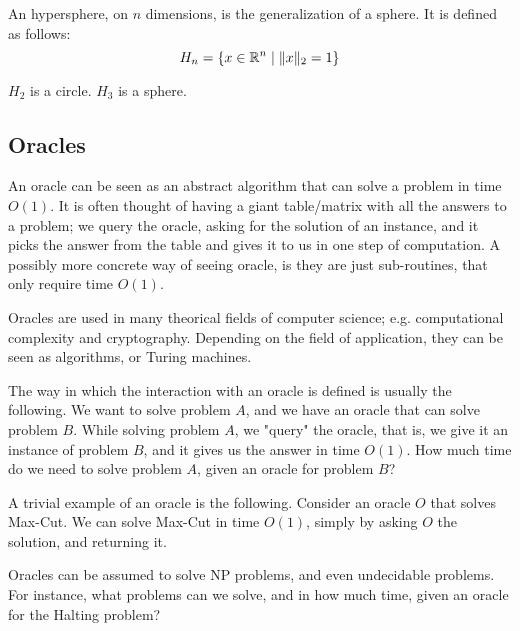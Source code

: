     An hypersphere, on $n$ dimensions, is the generalization of a sphere.
    It is defined as follows:
    \[ H_n = \{ x \in \mathbb{R}^n \; \vert \; \lVert x \rVert_2 = 1 \} \]

    $H_2$ is a circle. $H_3$ is a sphere.


\subsection{Oracles}\label{subsec:oracles_cc}
    An oracle can be seen as an abstract algorithm that can solve a problem in time $O(1)$.
    It is often thought of having a giant table/matrix with all the answers to a problem; we query the oracle, asking for the solution of an instance, and it picks the answer from the table and gives it to us in one step of computation. A possibly more concrete way of seeing oracle, is they are just sub-routines, that only require time $O(1)$.

    Oracles are used in many theorical fields of computer science; e.g. computational complexity and cryptography.
    Depending on the field of application, they can be seen as algorithms, or Turing machines.

    The way in which the interaction with an oracle is defined is usually the following.
    We want to solve problem $A$, and we have an oracle that can solve problem $B$. While solving problem $A$, we "query" the oracle, that is, we give it an instance of problem $B$, and it gives us the answer in time $O(1)$. How much time do we need to solve problem $A$, given an oracle for problem $B$?

    A trivial example of an oracle is the following.
    Consider an oracle $O$ that solves Max-Cut. We can solve Max-Cut in time $O(1)$, simply by asking $O$ the solution, and returning it.

    Oracles can be assumed to solve NP problems, and even undecidable problems. For instance, what problems can we solve, and in how much time, given an oracle for the Halting problem?
    

    